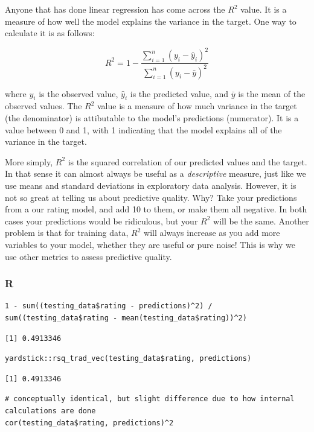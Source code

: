 \documentclass[
  letterpaper,
]{krantz}
\begin{document}
Anyone that has done linear regression has come across the \(R^2\)
value. It is a measure of how well the model explains the variance in
the target. One way to calculate it is as follows:

\[R^2 = 1 - \frac{\sum_{i=1}^{n}(y_i - \hat{y}_i)^2}{\sum_{i=1}^{n}(y_i - \bar{y})^2}\]

where \(y_i\) is the observed value, \(\hat{y}_i\) is the predicted
value, and \(\bar{y}\) is the mean of the observed values. The \(R^2\)
value is a measure of how much variance in the target (the denominator)
is attibutable to the model's predictions (numerator). It is a value
between 0 and 1, with 1 indicating that the model explains all of the
variance in the target.

More simply, \(R^2\) is the squared correlation of our predicted values
and the target. In that sense it can almost always be useful as a
\emph{descriptive} measure, just like we use means and standard
deviations in exploratory data analysis. However, it is not so great at
telling us about predictive quality. Why? Take your predictions from a
our rating model, and add 10 to them, or make them all negative. In both
cases your predictions would be ridiculous, but your \(R^2\) will be the
same. Another problem is that for training data, \(R^2\) will always
increase as you add more variables to your model, whether they are
useful or pure noise! This is why we use other metrics to assess
predictive quality.

\subsubsection{R}

\begin{verbatim}
1 - sum((testing_data$rating - predictions)^2) / sum((testing_data$rating - mean(testing_data$rating))^2)
\end{verbatim}

\begin{verbatim}
[1] 0.4913346
\end{verbatim}

\begin{verbatim}
yardstick::rsq_trad_vec(testing_data$rating, predictions)
\end{verbatim}

\begin{verbatim}
[1] 0.4913346
\end{verbatim}

\begin{verbatim}
# conceptually identical, but slight difference due to how internal calculations are done
cor(testing_data$rating, predictions)^2 
\end{verbatim}
\end{document}
